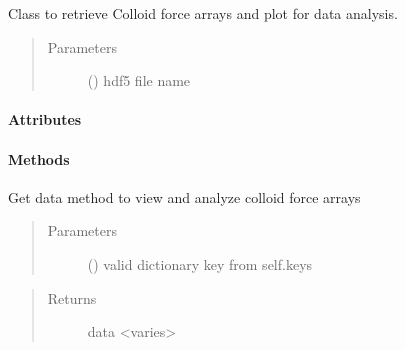 \documentclass[letterpaper,10pt,english]{sphinxmanual}
\begin{document}

\begin{fulllineitems}
\label{\detokenize{index:lb_colloids.Colloids.Colloid_output.ModelPlot}}
Class to retrieve Colloid force arrays
and plot for data analysis.
\begin{quote}\begin{description}
\item[{Parameters}] \leavevmode
{} () \textendash{} hdf5 file name

\end{description}\end{quote}
\paragraph{Attributes}
\paragraph{Methods}

\begin{fulllineitems}
\label{\detokenize{index:lb_colloids.Colloids.Colloid_output.ModelPlot.get_data}}
Get data method to view and analyze colloid
force arrays
\begin{quote}\begin{description}
\item[{Parameters}] \leavevmode
{} () \textendash{} valid dictionary key from self.keys

\end{description}\end{quote}
\begin{quote}\begin{description}
\item[{Returns}] \leavevmode
data \textless{}varies\textgreater{}

\end{description}\end{quote}

\end{fulllineitems}


\end{fulllineitems}
\end{document}
